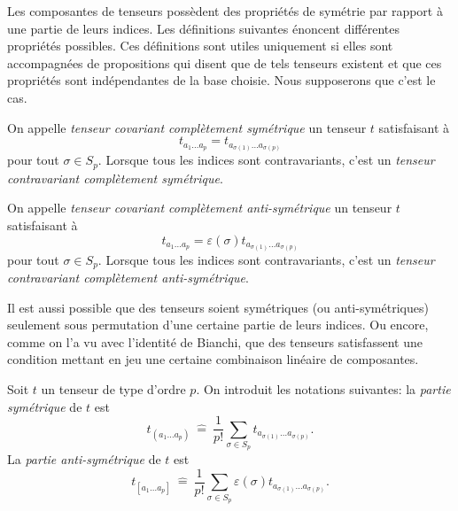 \documentclass[a4paper,11pt]{report}
\begin{document}
                Les composantes de tenseurs possèdent des propriétés de symétrie par rapport à une partie de leurs indices. Les définitions suivantes énoncent différentes propriétés possibles. Ces définitions sont utiles uniquement si elles sont accompagnées de propositions qui disent que de tels tenseurs existent et que ces propriétés sont indépendantes de la base choisie. Nous supposerons que c'est le cas.
                
                \begin{definition}
                    On appelle \textit{tenseur covariant complètement symétrique} un tenseur $t$ satisfaisant à
                    \begin{equation}
                            t_{a_1\dots a_p} = t_{a_{\sigma(1)}\dots a_{\sigma(p)}}
                    \end{equation}
                    pour tout $\sigma\in S_p$. Lorsque tous les indices sont contravariants, c'est un \textit{tenseur contravariant complètement symétrique}.
                \end{definition}
                
                \begin{definition}
                    On appelle \textit{tenseur covariant complètement anti-symétrique} un tenseur $t$ satisfaisant à
                    \begin{equation}
                            t_{a_1\dots a_p} = \varepsilon(\sigma)t_{a_{\sigma(1)}\dots a_{\sigma(p)}}
                    \end{equation}
                    pour tout $\sigma\in S_p$. Lorsque tous les indices sont contravariants, c'est un \textit{tenseur contravariant complètement anti-symétrique}.
                \end{definition}
                
                Il est aussi possible que des tenseurs soient symétriques (ou anti-symétriques) seulement sous permutation d'une certaine partie de leurs indices. Ou encore, comme on l'a vu avec l'identité de Bianchi, que des tenseurs satisfassent une condition mettant en jeu une certaine combinaison linéaire de composantes.\\
                
                \begin{definition}
                    Soit $t$ un tenseur de type d'ordre $p$. On introduit les notations suivantes: la \textit{partie symétrique} de $t$ est 
                    \begin{equation}
                        t_{(a_1\dots a_p)} ~\hat{=}~ \frac{1}{p!} \sum_{\sigma\in S_p}t_{a_{\sigma(1)}\dots a_{\sigma(p)}}.
                    \end{equation}
                    La \textit{partie anti-symétrique} de $t$ est 
                    \begin{equation}
                        t_{[a_1\dots a_p]} ~\hat{=}~ \frac{1}{p!} \sum_{\sigma\in S_p}\varepsilon(\sigma) t_{a_{\sigma(1)}\dots a_{\sigma(p)}}.
                    \end{equation}
                 \end{definition}
                
\end{document}
